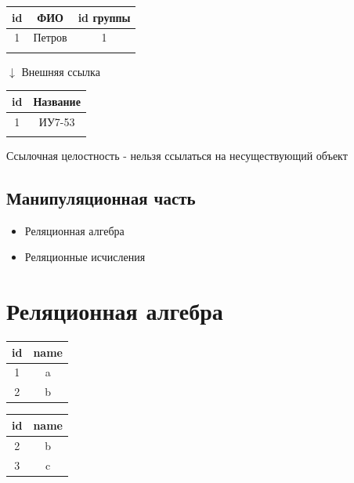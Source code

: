 \documentclass[a4paper, 14pt]{report}
\begin{document}
\begin{center}
    \begin{tabular}{|c|c|c|}
        \hline
        id & ФИО & id группы \\
        \hline
        1 & Петров & 1 \\
        \hline
        & & \\
        \hline
    \end{tabular}

    $\downarrow$ Внешняя ссылка

    \begin{tabular}{|c|c|}
        \hline
        id & Название \\
        \hline
        1 & ИУ7-53 \\
        \hline
        & \\
        \hline
    \end{tabular}
\end{center}

Ссылочная целостность - нельзя ссылаться на несуществующий объект

\subsection{Манипуляционная часть}

\begin{itemize}
    \item Реляционная алгебра
    \item Реляционные исчисления
\end{itemize}

\section{Реляционная алгебра}

\begin{tabular}{|c|c|}
    \hline
    id & name \\
    \hline
    1 & a \\
    \hline
    2 & b \\
    \hline
\end{tabular}

\hfill

\begin{tabular}{|c|c|}
    \hline
    id & name \\
    \hline
    2 & b \\
    \hline
    3 & c \\
    \hline
\end{tabular}
\end{document}

